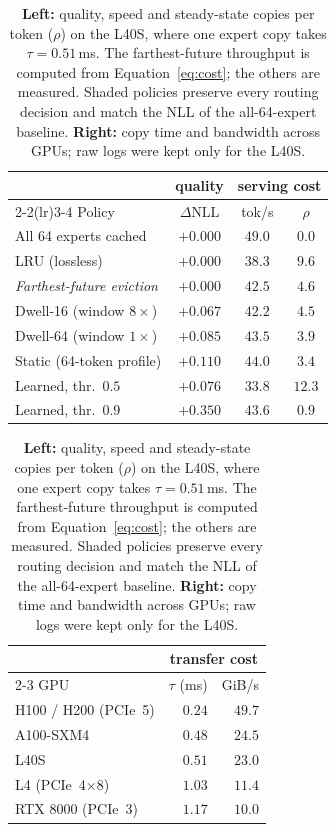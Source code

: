 \documentclass{article}
\newcommand{\xf}{\ensuremath{\rho}}
\begin{document}
\begin{table}[t]

\centering

\caption{\textbf{Left:} quality, speed and steady-state copies per token
($\xf$) on the L40S, where one expert copy takes $\tau=0.51$\,ms. The
farthest-future throughput is computed from Equation~\eqref{eq:cost}; the
others are measured. Shaded policies preserve every routing decision and match
the NLL of the all-64-expert baseline. \textbf{Right:} copy time and bandwidth
across GPUs; raw logs were kept only for the L40S.}

\label{tab:frontier}\label{tab:tau}
\scriptsize
\begin{minipage}[t]{0.62\linewidth}
\centering
\begin{tabular}{l c | c c}
\toprule
 & quality & \multicolumn{2}{c}{serving cost} \\
\cmidrule(lr){2-2}\cmidrule(lr){3-4}
Policy & $\Delta$NLL & tok/s & $\xf$ \\
\midrule
\rowcolor{black!8} All 64 experts cached & $+0.000$ & $49.0$ & $0.0$ \\
\rowcolor{black!8} LRU (lossless) & $+0.000$ & $38.3$ & $9.6$ \\
\rowcolor{black!8} \emph{Farthest-future eviction} & $+0.000$ & $42.5$ & $4.6$ \\
Dwell-16 (window $8\times$) & $+0.067$ & $42.2$ & $4.5$ \\
Dwell-64 (window $1\times$) & $+0.085$ & $43.5$ & $3.9$ \\
Static (64-token profile) & $+0.110$ & $44.0$ & $3.4$ \\
Learned, thr.\ $0.5$ & $+0.076$ & $33.8$ & $12.3$ \\
Learned, thr.\ $0.9$ & $+0.350$ & $43.6$ & $0.9$ \\
\bottomrule
\end{tabular}
\end{minipage}\hfill
\begin{minipage}[t]{0.35\linewidth}
\centering
\begin{tabular}{lrr}
\toprule
 & \multicolumn{2}{c}{transfer cost} \\
\cmidrule(lr){2-3}
GPU & $\tau$ (ms) & GiB/s \\
\midrule
H100 / H200 (PCIe~5) & $0.24$ & $49.7$ \\
A100-SXM4 & $0.48$ & $24.5$ \\
L40S & $0.51$ & $23.0$ \\
L4 (PCIe~4$\times$8) & $1.03$ & $11.4$ \\
RTX 8000 (PCIe~3) & $1.17$ & $10.0$ \\
\bottomrule
\end{tabular}
\end{minipage}
\end{table}
\end{document}
